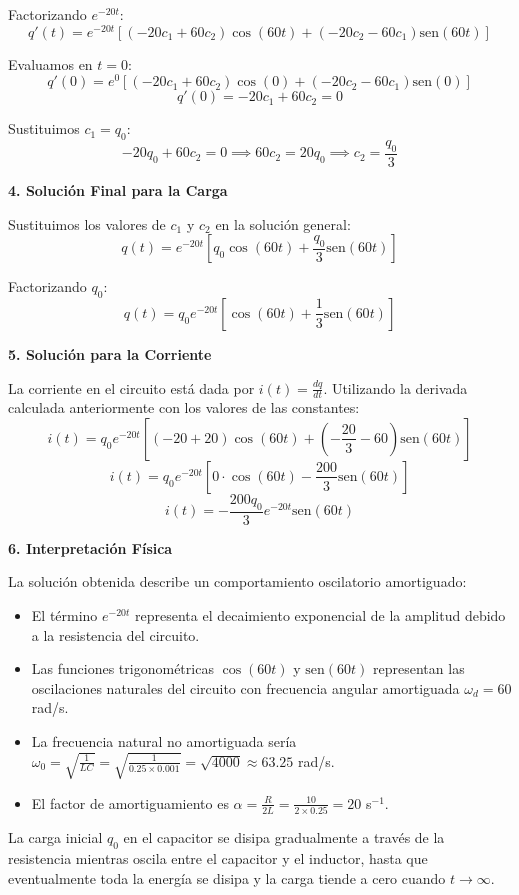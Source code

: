 \documentclass[a4paper]{article}
\begin{document}
Factorizando $e^{-20t}$:
$$
q'(t) = e^{-20t}[(-20c_1 + 60c_2)\cos(60t) + (-20c_2 - 60c_1)\text{sen}(60t)]
$$

Evaluamos en $t = 0$:
$$
q'(0) = e^{0}[(-20c_1 + 60c_2)\cos(0) + (-20c_2 - 60c_1)\text{sen}(0)]
$$
$$
q'(0) = -20c_1 + 60c_2 = 0
$$

Sustituimos $c_1 = q_0$:
$$
-20q_0 + 60c_2 = 0 \implies 60c_2 = 20q_0 \implies c_2 = \frac{q_0}{3}
$$

\textbf{4. Solución Final para la Carga}

Sustituimos los valores de $c_1$ y $c_2$ en la solución general:
$$
q(t) = e^{-20t}\left[q_0 \cos(60t) + \frac{q_0}{3} \text{sen}(60t)\right]
$$

Factorizando $q_0$:
$$
q(t) = q_0 e^{-20t}\left[\cos(60t) + \frac{1}{3} \text{sen}(60t)\right]
$$

\textbf{5. Solución para la Corriente}

La corriente en el circuito está dada por $i(t) = \frac{dq}{dt}$. Utilizando la derivada calculada anteriormente con los valores de las constantes:
$$
i(t) = q_0 e^{-20t}\left[(-20 + 20)\cos(60t) + \left(-\frac{20}{3} - 60\right)\text{sen}(60t)\right]
$$
$$
i(t) = q_0 e^{-20t}\left[0 \cdot \cos(60t) - \frac{200}{3}\text{sen}(60t)\right]
$$
$$
i(t) = -\frac{200q_0}{3} e^{-20t} \text{sen}(60t)
$$

\textbf{6. Interpretación Física}

La solución obtenida describe un comportamiento oscilatorio amortiguado:
\begin{itemize}
    \item El término $e^{-20t}$ representa el decaimiento exponencial de la amplitud debido a la resistencia del circuito.
    \item Las funciones trigonométricas $\cos(60t)$ y $\text{sen}(60t)$ representan las oscilaciones naturales del circuito con frecuencia angular amortiguada $\omega_d = 60$ rad/s.
    \item La frecuencia natural no amortiguada sería $\omega_0 = \sqrt{\frac{1}{LC}} = \sqrt{\frac{1}{0.25 \times 0.001}} = \sqrt{4000} \approx 63.25$ rad/s.
    \item El factor de amortiguamiento es $\alpha = \frac{R}{2L} = \frac{10}{2 \times 0.25} = 20$ s$^{-1}$.
\end{itemize}

La carga inicial $q_0$ en el capacitor se disipa gradualmente a través de la resistencia mientras oscila entre el capacitor y el inductor, hasta que eventualmente toda la energía se disipa y la carga tiende a cero cuando $t \to \infty$.
\end{document}
